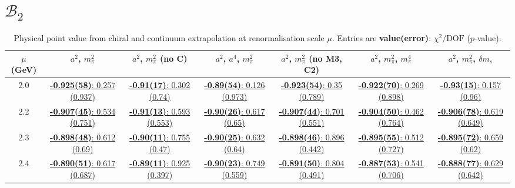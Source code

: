\documentclass[12pt]{extarticle}
\begin{document}
\section{$\mathcal{B}_2$}
\begin{table}[h!]
\begin{center}
\begin{tabular}{|c|c|c|c|c|c|c|}
\hline
$\mu$ (GeV) & $a^2$, $m_\pi^2$& $a^2$, $m_\pi^2$ (no C)& $a^2$, $a^4$, $m_\pi^2$& $a^2$, $m_\pi^2$ (no M3, C2)& $a^2$, $m_\pi^2$, $m_\pi^4$& $a^2$, $m_\pi^2$, $\delta m_s$\\
\hline
2.0& \hyperlink{VVmAA/SUSY/a2m2_20.pdf.1}{\textbf{-0.925(58)}: 0.257 (0.937)} & \hyperlink{VVmAA/SUSY/a2m2noC_20.pdf.1}{\textbf{-0.91(17)}: 0.302 (0.74)} & \hyperlink{VVmAA/SUSY/a2a4m2_20.pdf.1}{\textbf{-0.89(54)}: 0.126 (0.973)} & \hyperlink{VVmAA/SUSY/a2m2mcut_20.pdf.1}{\textbf{-0.923(54)}: 0.35 (0.789)} & \hyperlink{VVmAA/SUSY/a2m2m4_20.pdf.1}{\textbf{-0.922(70)}: 0.269 (0.898)} & \hyperlink{VVmAA/SUSY/a2m2delm_20.pdf.1}{\textbf{-0.93(15)}: 0.157 (0.96)}\\
2.2& \hyperlink{VVmAA/SUSY/a2m2_22.pdf.1}{\textbf{-0.907(45)}: 0.534 (0.751)} & \hyperlink{VVmAA/SUSY/a2m2noC_22.pdf.1}{\textbf{-0.91(13)}: 0.593 (0.553)} & \hyperlink{VVmAA/SUSY/a2a4m2_22.pdf.1}{\textbf{-0.90(26)}: 0.617 (0.65)} & \hyperlink{VVmAA/SUSY/a2m2mcut_22.pdf.1}{\textbf{-0.907(44)}: 0.701 (0.551)} & \hyperlink{VVmAA/SUSY/a2m2m4_22.pdf.1}{\textbf{-0.904(50)}: 0.462 (0.764)} & \hyperlink{VVmAA/SUSY/a2m2delm_22.pdf.1}{\textbf{-0.906(78)}: 0.619 (0.649)}\\
2.3& \hyperlink{VVmAA/SUSY/a2m2_23.pdf.1}{\textbf{-0.898(48)}: 0.612 (0.69)} & \hyperlink{VVmAA/SUSY/a2m2noC_23.pdf.1}{\textbf{-0.90(11)}: 0.755 (0.47)} & \hyperlink{VVmAA/SUSY/a2a4m2_23.pdf.1}{\textbf{-0.90(25)}: 0.632 (0.64)} & \hyperlink{VVmAA/SUSY/a2m2mcut_23.pdf.1}{\textbf{-0.898(46)}: 0.896 (0.442)} & \hyperlink{VVmAA/SUSY/a2m2m4_23.pdf.1}{\textbf{-0.895(55)}: 0.512 (0.727)} & \hyperlink{VVmAA/SUSY/a2m2delm_23.pdf.1}{\textbf{-0.895(72)}: 0.659 (0.62)}\\
2.4& \hyperlink{VVmAA/SUSY/a2m2_24.pdf.1}{\textbf{-0.890(51)}: 0.617 (0.687)} & \hyperlink{VVmAA/SUSY/a2m2noC_24.pdf.1}{\textbf{-0.89(11)}: 0.925 (0.397)} & \hyperlink{VVmAA/SUSY/a2a4m2_24.pdf.1}{\textbf{-0.90(23)}: 0.749 (0.559)} & \hyperlink{VVmAA/SUSY/a2m2mcut_24.pdf.1}{\textbf{-0.891(50)}: 0.804 (0.491)} & \hyperlink{VVmAA/SUSY/a2m2m4_24.pdf.1}{\textbf{-0.887(53)}: 0.541 (0.706)} & \hyperlink{VVmAA/SUSY/a2m2delm_24.pdf.1}{\textbf{-0.888(77)}: 0.629 (0.642)}\\
\hline
\end{tabular}
\caption{Physical point value from chiral and continuum extrapolation at renormalisation scale $\mu$. Entries are \textbf{value(error)}: $\chi^2/\text{DOF}$ ($p$-value).}
\end{center}
\end{table}
\end{document}
